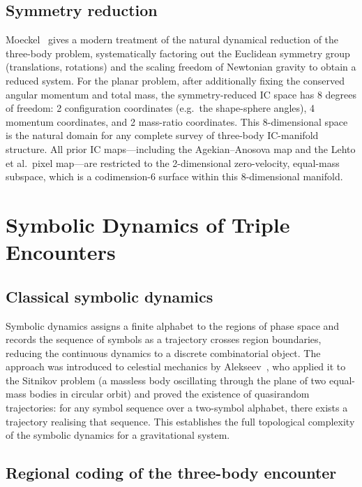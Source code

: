 \documentclass[11pt,a4paper]{article}
\begin{document}
\subsection{Symmetry reduction}

Moeckel~\cite{moeckel2023} gives a modern treatment of the natural dynamical reduction of the
three-body problem, systematically factoring out the Euclidean symmetry group (translations,
rotations) and the scaling freedom of Newtonian gravity to obtain a reduced system.  For the
planar problem, after additionally fixing the conserved angular momentum and total mass, the
symmetry-reduced IC space has 8 degrees of freedom: 2 configuration coordinates (e.g.\ the
shape-sphere angles), 4 momentum coordinates, and 2 mass-ratio coordinates.  This 8-dimensional
space is the natural domain for any complete survey of three-body IC-manifold structure.  All
prior IC maps---including the Agekian--Anosova map and the Lehto et al.\ pixel map---are
restricted to the 2-dimensional zero-velocity, equal-mass subspace, which is a
codimension-6 surface within this 8-dimensional manifold.

\section{Symbolic Dynamics of Triple Encounters}
\label{sec:symbolic}

\subsection{Classical symbolic dynamics}

Symbolic dynamics assigns a finite alphabet to the regions of phase space and records the
sequence of symbols as a trajectory crosses region boundaries, reducing the continuous dynamics
to a discrete combinatorial object.  The approach was introduced to celestial mechanics by
Alekseev~\cite{alekseev1969}, who applied it to the Sitnikov problem (a massless body
oscillating through the plane of two equal-mass bodies in circular orbit) and proved the
existence of quasirandom trajectories: for any symbol sequence over a two-symbol alphabet,
there exists a trajectory realising that sequence.  This establishes the full topological
complexity of the symbolic dynamics for a gravitational system.

\subsection{Regional coding of the three-body encounter}
\end{document}
